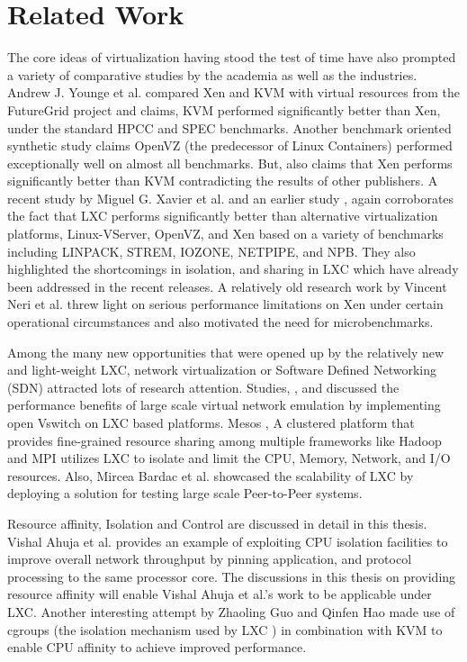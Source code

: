 \chapter{Related Work}

The core ideas of virtualization having stood the test of time have also prompted a variety of comparative studies by the academia as well as the industries.
Andrew J. Younge et al. \cite{younge2011analysis} compared Xen and KVM with virtual resources from the FutureGrid project \cite{futuregrid} and claims, KVM performed significantly better than Xen, under the standard HPCC and SPEC  benchmarks. Another benchmark oriented synthetic study \cite{synthetic} claims OpenVZ (the predecessor of Linux Containers) performed exceptionally well on almost all benchmarks. But, also claims that Xen performs significantly better than KVM contradicting the results of other publishers.
A recent study by Miguel G. Xavier et al. \cite{container1} and an earlier study \cite{container2}, again corroborates the fact that LXC performs significantly better than alternative virtualization platforms, Linux-VServer, OpenVZ, and Xen based on a variety of benchmarks including LINPACK, STREM, IOZONE, NETPIPE, and NPB. They also highlighted the shortcomings in isolation, and sharing in LXC which have already been addressed in the recent releases.
A relatively old research work by Vincent Neri et al. \cite{fourcomp} threw light on serious performance limitations on Xen under certain operational circumstances and also motivated the need for microbenchmarks.

Among the many new opportunities that were opened up by the relatively new and light-weight LXC, network virtualization or Software Defined Networking (SDN) attracted lots of research attention. Studies, \cite{sdn1}, and \cite{sdn2} discussed the performance benefits of large scale virtual network emulation by implementing open Vswitch \cite{openvswitch} on LXC based platforms. 
Mesos \cite{mesos} , A clustered platform that provides fine-grained resource sharing among multiple frameworks like Hadoop \cite{hadoop} and MPI \cite{mpi} utilizes LXC to isolate and limit the CPU, Memory, Network, and I/O resources. Also, Mircea Bardac et al. \cite{peer} showcased the scalability of LXC by deploying a solution for testing large scale Peer-to-Peer systems.

Resource affinity, Isolation and Control are discussed in detail in this thesis. Vishal Ahuja et al. \cite{cacheaware} provides an example of exploiting CPU isolation facilities to improve overall network throughput by pinning application, and protocol processing to the same processor core. The discussions in this thesis on providing resource affinity will enable Vishal Ahuja et al.'s  work to be applicable under LXC.
Another interesting attempt by Zhaoling Guo and Qinfen Hao \cite{kvmaffinity} made use of cgroups (the isolation mechanism used by LXC ) in combination with KVM to enable CPU affinity to achieve improved performance.



